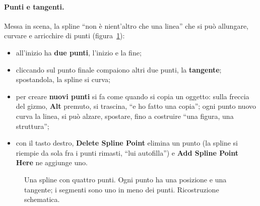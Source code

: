 \paragraph{Punti e tangenti.} Messa in scena, la spline ``non è nient'altro che una linea'' che
si può allungare, curvare e arricchire di punti (figura~\ref{ue16:fig:spline}):
\begin{itemize}
  \item all'inizio ha \textbf{due punti}, l'inizio e la fine;
  \item cliccando sul punto finale compaiono altri due punti, la \textbf{tangente}; spostandola,
        la spline si curva;
  \item per creare \textbf{nuovi punti} si fa come quando si copia un oggetto: sulla freccia
        del gizmo, \textbf{Alt} premuto, si trascina, ``e ho fatto una copia''; ogni punto
        nuovo curva la linea, si può alzare, spostare, fino a costruire ``una figura, una
        struttura'';
  \item con il tasto destro, \textbf{Delete Spline Point} elimina un punto (la spline si
        riempie da sola fra i punti rimasti, ``lui autofilla'') e \textbf{Add Spline Point
        Here} ne aggiunge uno.
\end{itemize}

\begin{figure}[htbp]
\centering
{}
\caption{Una spline con quattro punti. Ogni punto ha una posizione e una tangente; i segmenti
sono uno in meno dei punti. Ricostruzione schematica.}
\label{ue16:fig:spline}
\end{figure}


